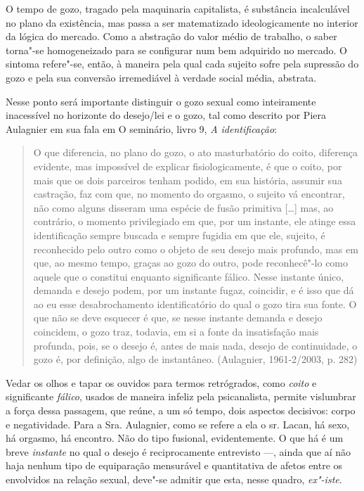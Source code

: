 O tempo de gozo, tragado pela maquinaria capitalista, é substância
incalculável no plano da existência, mas passa a ser matematizado
ideologicamente no interior da lógica do mercado. Como a abstração do
valor médio de trabalho, o saber torna"-se homogeneizado para se
configurar num bem adquirido no mercado. O sintoma refere"-se, então, à
maneira pela qual cada sujeito sofre pela supressão do gozo e pela sua
conversão irremediável à verdade social média, abstrata.

Nesse ponto será importante distinguir o gozo sexual como inteiramente
inacessível no horizonte do desejo/lei e o gozo, tal como descrito por
Piera Aulagnier em sua fala em O seminário, livro 9, \emph{A
identificação}:

\begin{quote}
O que diferencia, no plano do gozo, o ato masturbatório do coito,
diferença evidente, mas impossível de explicar fisiologicamente, é que o
coito, por mais que os dois parceiros tenham podido, em sua história,
assumir sua castração, faz com que, no momento do orgasmo, o sujeito vá
encontrar, não como alguns disseram uma espécie de fusão primitiva
{[}\ldots{}{]} mas, ao contrário, o momento privilegiado em que, por um
instante, ele atinge essa identificação sempre buscada e sempre fugidia
em que ele, sujeito, é reconhecido pelo outro como o objeto de seu
desejo mais profundo, mas em que, ao mesmo tempo, graças ao gozo do
outro, pode reconhecê"-lo como aquele que o constitui enquanto
significante fálico. Nesse instante único, demanda e desejo podem, por
um instante fugaz, coincidir, e é isso que dá ao eu esse desabrochamento
identificatório do qual o gozo tira sua fonte. O que não se deve
esquecer é que, se nesse instante demanda e desejo coincidem, o gozo
traz, todavia, em si a fonte da insatisfação mais profunda, pois, se o
desejo é, antes de mais nada, desejo de continuidade, o gozo é, por
definição, algo de instantâneo. (Aulagnier, 1961-2/2003, p. 282)
\end{quote}

Vedar os olhos e tapar os ouvidos para termos retrógrados, como
\emph{coito} e significante \emph{fálico}, usados de maneira infeliz
pela psicanalista, permite vislumbrar a força dessa passagem, que reúne,
a um só tempo, dois aspectos decisivos: corpo e negatividade. Para a
Sra. Aulagnier, como se refere a ela o sr. Lacan, há sexo, há orgasmo,
há encontro. Não do tipo fusional, evidentemente. O que há é um breve
\emph{instante} no qual o desejo é reciprocamente entrevisto ---, ainda
que aí não haja nenhum tipo de equiparação mensurável e quantitativa de
afetos entre os envolvidos na relação sexual, deve"-se admitir que esta,
nesse quadro, \emph{ex"-iste}.

